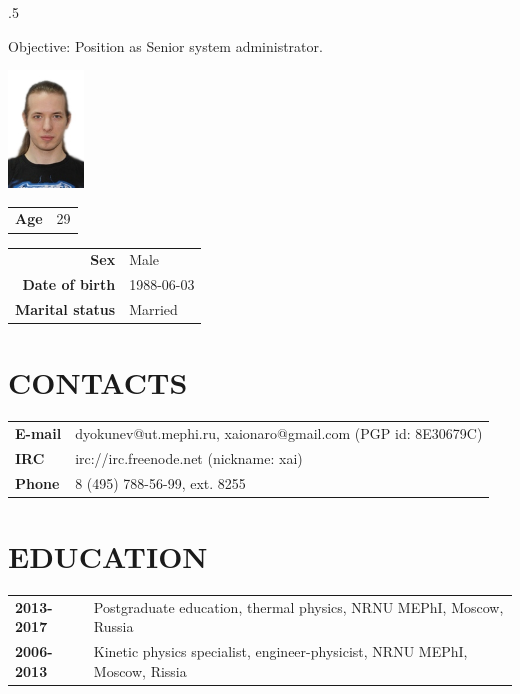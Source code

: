 \address{115522, 2 Moskvorechie Street (building 1), Moscow, Russia}


\begin{resume}
\vspace{0.1in}
\moveleft.5\sectionwidth\centerline{Objective: Position as Senior system administrator.}  

\vspace{-6.5em}
\flushright
\includegraphics[width=20mm]{photo.jpg}\\
\begin{tabular}{ll}
 {\bf Age} & 29\\
\end{tabular}
\flushleft

\vspace{-5.5em}
\begin{tabular}{rl}
 {\bf Sex}            & Male\\
 {\bf Date of birth}  & 1988-06-03\\
 {\bf Marital status} & Married\\
\end{tabular}

\section{CONTACTS}
\vspace{0.1in} 
\begin{tabular}{ll}
 {\bf E-mail} & dyokunev@ut.mephi.ru, xaionaro@gmail.com (PGP id: 8E30679C)\\
 {\bf IRC}    & irc://irc.freenode.net (nickname: xai)\\
 {\bf Phone}  & 8 (495) 788-56-99, ext. 8255\\
\end{tabular}

\section{EDUCATION}
\vspace{0.1in} 
\begin{tabular}{ll}
 {\bf 2013-2017} & Postgraduate education, thermal physics, NRNU MEPhI, Moscow, Russia\\
 {\bf 2006-2013} & Kinetic physics specialist, engineer-physicist, NRNU MEPhI, Moscow, Rissia\\
\end{tabular}


\end{resume}
